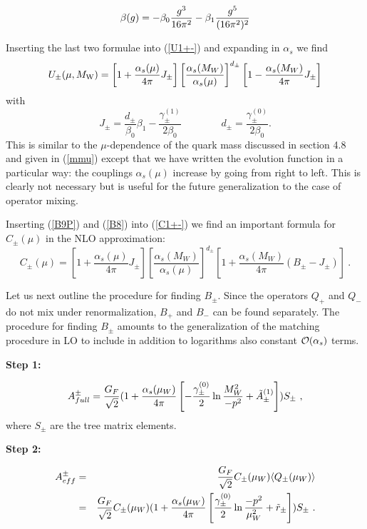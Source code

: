 \documentclass[12pt]{article}
\def\as{\alpha_s}
\newcommand{\mw}{M_{\rm W}}
\newcommand{\ord}{{\cal O}}
\begin{document}
\begin{itemize}
\begin{itemize}
\begin{itemize}
\begin{equation}\label{bg01P}
\beta(g)=-\beta_0{g^3\over 16\pi^2}-\beta_1{g^5\over (16\pi^2)^2}
  \end{equation}

Inserting the last two formulae into (\ref{U1+-}) and expanding in
$\alpha_s$ we find
\begin{equation}\label{B9P}
U_\pm(\mu,\mw)=\left[1+\frac{\as(\mu)}{4\pi}J_\pm\right]
      \left[\frac{\as(M_W)}{\as(\mu)}\right]^{d_\pm}
\left[1-\frac{\as(M_W)}{4\pi} J_\pm\right]
\end{equation}
with
\begin{equation}\label{B10P}
J_\pm=\frac{d_\pm}{\beta_0}\beta_1-\frac{\gamma^{(1)}_\pm}{2\beta_0}
\qquad\qquad
d_\pm=\frac{\gamma^{(0)}_\pm}{2\beta_0}.
\end{equation}
This is similar to the $\mu$-dependence of the quark mass discussed
in section 4.8 and given in (\ref{mmu}) except that we have 
written the evolution function
in a particular way: the couplings $\as(\mu)$ increase by going from
right to left. This is clearly not necessary but is useful for the
future generalization to the case of operator mixing.

Inserting (\ref{B9P}) and (\ref{B8}) into (\ref{C1+-}) we find
an important formula for $C_\pm(\mu)$ in the NLO approximation:
\begin{equation}\label{B9PP}
C_\pm(\mu)=\left[1+\frac{\as(\mu)}{4\pi}J_\pm\right]
      \left[\frac{\as(M_W)}{\as(\mu)}\right]^{d_\pm}
\left[1+\frac{\as(M_W)}{4\pi}(B_\pm-J_\pm)\right]~.
\end{equation}

Let us next outline the procedure for finding $B_\pm$.
Since the operators $Q_+$ and $Q_-$ do not mix under renormalization,
$B_+$ and $B_-$ can be found separately. 
The procedure for finding $B_\pm$ amounts to the generalization of
the matching procedure in
LO to include in addition to logarithms also
constant $\ord (\as)$ terms.

{\bf Step 1:}

\begin{equation}\label{amp2}
A^\pm_{full} =
{G_F\over\sqrt{2}}(1+{\as(\mu_W)\over 4\pi}\left[-{{\gamma^{(0)}_\pm}\over 2}
\ln{M^2_W\over -p^2}+\tilde A^{(1)}_\pm\right]) S_\pm~,  \end{equation}
where $S_\pm$ are the tree matrix elements.

{\bf Step 2:}

\vspace{-0.41truecm}
\begin{eqnarray}\label{aef2}
A^\pm_{eff}&=&{G_F\over\sqrt{2}}C_\pm (\mu_W)\langle Q_\pm(\mu_W)\rangle \\
&=&{G_F\over\sqrt{2}}C_\pm(\mu_W)
(1+{\as(\mu_W)\over 4\pi}\left[{{\gamma^{(0)}_\pm}\over 2}
 \ln{-p^2\over\mu^2_W}+\tilde r_\pm
 \right])S_\pm~.   \nonumber
\end{eqnarray}


\end{itemize}
\end{itemize}
\end{itemize}
\end{document}
